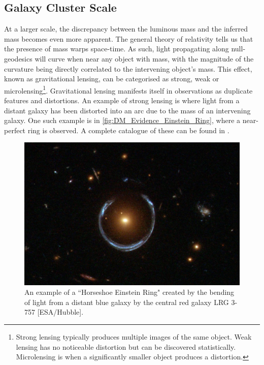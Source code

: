 \subsection{Galaxy Cluster Scale}
\par
At a larger scale, the discrepancy between the luminous mass and the inferred mass becomes even more apparent.
The general theory of relativity tells us that the presence of mass warps space-time.
As such, light propagating along null-geodesics will curve when near any object with mass, with the magnitude of the curvature being directly correlated to the intervening object's mass.
This effect, known as gravitational lensing, can be categorised as strong, weak or microlensing\footnote{Strong lensing typically produces multiple images of the same object. Weak lensing has no noticeable distortion but can be discovered statistically. Microlensing is when a significantly smaller object produces a distortion.}. 
Gravitational lensing manifests itself in observations as duplicate features and distortions.
An example of strong lensing is where light from a distant galaxy has been distorted into an arc due to the mass of an intervening galaxy. 
One such example is in \autoref{fig:DM_Evidence_Einstein_Ring},  where a near-perfect ring is observed.
A complete catalogue of these can be found in \cite{einstein_ring_discovery_ref}.

\begin{figure}%
    \centering
    \includegraphics[scale=0.4]{Figures/DarkMatterEvidence/Einstein_Ring_from_Hubble.JPG}
    \caption{An example of a ``Horseshoe Einstein Ring" created by the bending of light from a distant blue galaxy by the central red galaxy LRG 3-757 [ESA/Hubble].}
    \label{fig:DM_Evidence_Einstein_Ring}
\end{figure}

